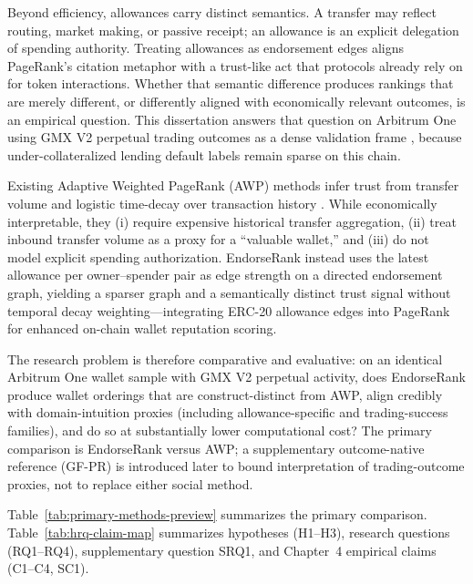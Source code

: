 Beyond efficiency, allowances carry distinct semantics. A transfer may reflect routing, market making, or passive receipt; an allowance is an explicit delegation of spending authority. Treating allowances as endorsement edges aligns PageRank's citation metaphor  with a trust-like act that protocols already rely on for token interactions. Whether that semantic difference produces rankings that are merely different, or differently aligned with economically relevant outcomes, is an empirical question. This dissertation answers that question on Arbitrum One using GMX V2 perpetual trading outcomes as a dense validation frame , because under-collateralized lending default labels remain sparse on this chain.


Existing Adaptive Weighted PageRank (AWP) methods infer trust from transfer volume and logistic time-decay over transaction history . While economically interpretable, they (i) require expensive historical transfer aggregation, (ii) treat inbound transfer volume as a proxy for a ``valuable wallet,'' and (iii) do not model explicit spending authorization. EndorseRank instead uses the latest allowance per owner--spender pair as edge strength on a directed endorsement graph, yielding a sparser graph and a semantically distinct trust signal without temporal decay weighting---integrating ERC-20 allowance edges into PageRank for enhanced on-chain wallet reputation scoring.

The research problem is therefore comparative and evaluative: on an identical Arbitrum One wallet sample with GMX V2 perpetual activity, does EndorseRank produce wallet orderings that are construct-distinct from AWP, align credibly with domain-intuition proxies (including allowance-specific and trading-success families), and do so at substantially lower computational cost? The primary comparison is EndorseRank versus AWP; a supplementary outcome-native reference (GF-PR) is introduced later to bound interpretation of trading-outcome proxies, not to replace either social method.

Table~\ref{tab:primary-methods-preview} summarizes the primary comparison. Table~\ref{tab:hrq-claim-map} summarizes hypotheses (H1--H3), research questions (RQ1--RQ4), supplementary question SRQ1, and Chapter~4 empirical claims (C1--C4, SC1).

